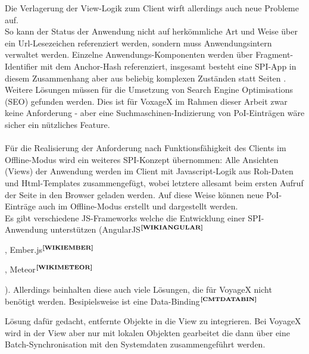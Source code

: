 \noindent
Die Verlagerung der View-Logik zum Client wirft allerdings auch neue Probleme auf.\\
So kann der Status der Anwendung nicht auf herkömmliche Art und Weise über ein Url-Lesezeichen referenziert werden, sondern muss Anwendungsintern verwaltet werden. Einzelne Anwendungs-Komponenten werden über Fragment-Identifier mit dem Anchor-Hash referenziert, insgesamt besteht eine SPI-App in diesem Zusammenhang aber aus beliebig komplexen Zuständen statt Seiten \cite{SPI:MF}.\\
Weitere Lösungen müssen für die Umsetzung von Search Engine Optimisations (SEO) gefunden werden. Dies ist für VoxageX im Rahmen dieser Arbeit zwar keine Anforderung - aber eine Suchmaschinen-Indizierung von PoI-Einträgen wäre sicher ein nützliches Feature.\\ \\
Für die Realisierung der Anforderung nach Funktionsfähigkeit des Clients im Offline-Modus wird ein weiteres SPI-Konzept übernommen: Alle Ansichten (Views) der Anwendung werden im Client mit Javascript-Logik aus Roh-Daten und Html-Templates zusammengefügt, wobei letztere allesamt beim ersten Aufruf der Seite in den Browser geladen werden. Auf diese Weise können neue PoI-Einträge auch im Offline-Modus erstellt und dargestellt werden.\\
Es gibt verschiedene JS-Frameworks welche die Entwicklung einer SPI-Anwendung unterstützen (AngularJS$^{\textbf{\ref{WIKIANGULAR}}}$%
\addtocounter{footnote}{1}%
,  Ember.js$^{\textbf{\ref{WIKIEMBER}}}$%
\addtocounter{footnote}{1}%
, Meteor$^{\textbf{\ref{WIKIMETEOR}}}$%
\addtocounter{footnote}{1}%
). Allerdings beinhalten diese auch viele Lösungen, die für VoyageX nicht benötigt werden. Besipielsweise ist eine Data-Binding$^{\textbf{\ref{CMTDATABIN}}}$%
\addtocounter{footnote}{1}%
 Lösung dafür gedacht, entfernte Objekte in die View zu integrieren. Bei VoyageX wird in der View aber nur mit lokalen Objekten gearbeitet die dann über eine Batch-Synchronisation mit den Systemdaten zusammengeführt werden.\\
	
